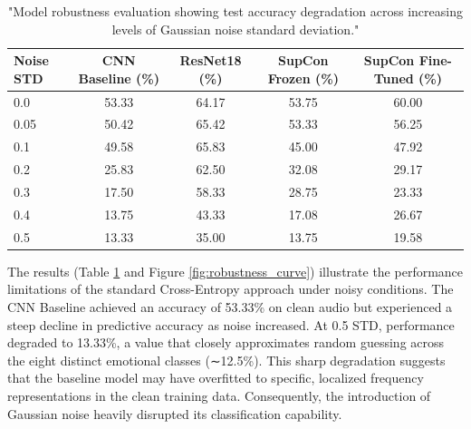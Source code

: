 \documentclass[12pt,hitec]{report}
\begin{document}
\begin{table}[H]
    \centering
    \begin{tabular}{lcccc}
    \hline
    \textbf{Noise STD} & \textbf{CNN Baseline (\%)} & \textbf{ResNet18 (\%)} & \textbf{SupCon Frozen (\%)} & \textbf{SupCon Fine-Tuned (\%)} \\ \hline
    0.0                & 53.33                      & 64.17                  & 53.75                       & 60.00                           \\
    0.05               & 50.42                      & 65.42                  & 53.33                       & 56.25                           \\
    0.1                & 49.58                      & 65.83                  & 45.00                       & 47.92                           \\
    0.2                & 25.83                      & 62.50                  & 32.08                       & 29.17                           \\
    0.3                & 17.50                      & 58.33                  & 28.75                       & 23.33                           \\
    0.4                & 13.75                      & 43.33                  & 17.08                       & 26.67                           \\
    0.5                & 13.33                      & 35.00                  & 13.75                       & 19.58                           \\ \hline
    \end{tabular}
    \caption{"Model robustness evaluation showing test accuracy degradation across increasing levels of Gaussian noise standard deviation."}
    \label{tab:noise_robustness}
\end{table}


The results (Table \ref{tab:noise_robustness} and Figure \ref{fig:robustness_curve}) illustrate the performance limitations of the standard Cross-Entropy approach under noisy conditions. The CNN Baseline achieved an accuracy of 53.33\% on clean audio but experienced a steep decline in predictive accuracy as noise increased. At 0.5 STD, performance degraded to 13.33\%, a value that closely approximates random guessing across the eight distinct emotional classes (∼12.5\%). This sharp degradation suggests that the baseline model may have overfitted to specific, localized frequency representations in the clean training data. Consequently, the introduction of Gaussian noise heavily disrupted its classification capability.
\end{document}
